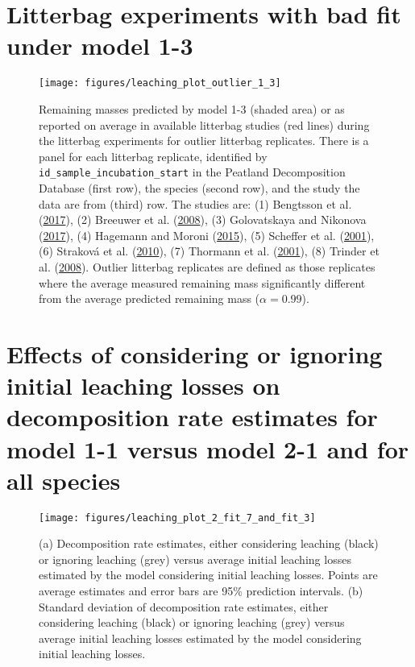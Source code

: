 \documentclass[
  12pt,
]{article}
\begin{document}
\hypertarget{sup-9}{%
\section{Litterbag experiments with bad fit under model 1-3}\label{sup-9}}



\begin{figure}[H]

{\centering \texttt{[image: figures/leaching\_plot\_outlier\_1\_3]} 

}

\caption{Remaining masses predicted by model 1-3 (shaded area) or as reported on average in available litterbag studies (red lines) during the litterbag experiments for outlier litterbag replicates. There is a panel for each litterbag replicate, identified by \texttt{id\_sample\_incubation\_start} in the Peatland Decomposition Database (first row), the species (second row), and the study the data are from (third) row. The studies are: (1) Bengtsson et al. (\protect\hyperlink{ref-Bengtsson.2017}{2017}), (2) Breeuwer et al. (\protect\hyperlink{ref-Breeuwer.2008}{2008}), (3) Golovatskaya and Nikonova (\protect\hyperlink{ref-Golovatskaya.2017}{2017}), (4) Hagemann and Moroni (\protect\hyperlink{ref-Hagemann.2015}{2015}), (5) Scheffer et al. (\protect\hyperlink{ref-Scheffer.2001}{2001}), (6) Straková et al. (\protect\hyperlink{ref-Strakova.2010}{2010}), (7) Thormann et al. (\protect\hyperlink{ref-Thormann.2001}{2001}), (8) Trinder et al. (\protect\hyperlink{ref-Trinder.2008}{2008}). Outlier litterbag replicates are defined as those replicates where the average measured remaining mass significantly different from the average predicted remaining mass (\(\alpha = 0.99\)).}\label{fig:sup-out-sdm-mm36-1-outlier-decomposition-trajectory-p1}
\end{figure}

\hypertarget{sup-10}{%
\section{Effects of considering or ignoring initial leaching losses on decomposition rate estimates for model 1-1 versus model 2-1 and for all species}\label{sup-10}}



\begin{figure}[H]

{\centering \texttt{[image: figures/leaching\_plot\_2\_fit\_7\_and\_fit\_3]} 

}

\caption{(a) Decomposition rate estimates, either considering leaching (black) or ignoring leaching (grey) versus average initial leaching losses estimated by the model considering initial leaching losses. Points are average estimates and error bars are 95\% prediction intervals. (b) Standard deviation of decomposition rate estimates, either considering leaching (black) or ignoring leaching (grey) versus average initial leaching losses estimated by the model considering initial leaching losses.}\label{fig:sup-out-mm27-1-mm28-1-p3}
\end{figure}
\end{document}
